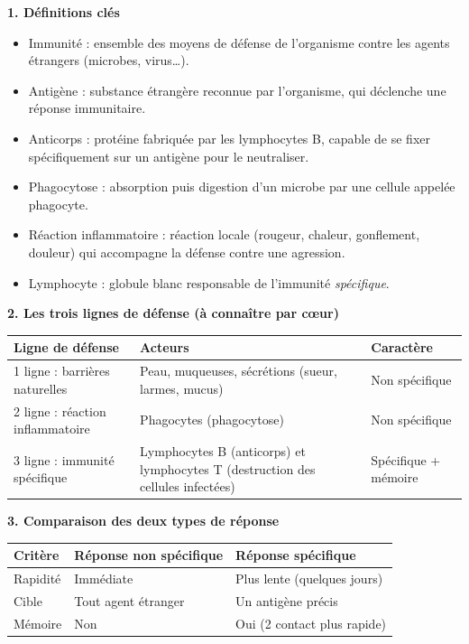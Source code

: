 \documentclass[11pt]{article}
\newcommand{\cle}[1]{{\popxbold\color{popdark}#1}}
\begin{document}
\begin{bilan}
\textbf{1. Définitions clés}
\begin{itemize}
\item \cle{Immunité} : ensemble des moyens de défense de l'organisme contre les agents étrangers (microbes, virus\ldots).
\item \cle{Antigène} : substance étrangère reconnue par l'organisme, qui déclenche une réponse immunitaire.
\item \cle{Anticorps} : protéine fabriquée par les lymphocytes B, capable de se fixer spécifiquement sur un antigène pour le neutraliser.
\item \cle{Phagocytose} : absorption puis digestion d'un microbe par une cellule appelée \cle{phagocyte}.
\item \cle{Réaction inflammatoire} : réaction locale (rougeur, chaleur, gonflement, douleur) qui accompagne la défense contre une agression.
\item \cle{Lymphocyte} : globule blanc responsable de l'immunité \emph{spécifique}.
\end{itemize}

\textbf{2. Les trois lignes de défense (à connaître par c\oe ur)}
\begin{center}
\begin{tabularx}{\linewidth}{|l|X|X|}
\hline
\rowcolor{popblueL} \textbf{Ligne de défense} & \textbf{Acteurs} & \textbf{Caractère} \\
\hline
1\iere{} ligne : barrières naturelles & Peau, muqueuses, sécrétions (sueur, larmes, mucus) & Non spécifique \\
\hline
2\ieme{} ligne : réaction inflammatoire & Phagocytes (phagocytose) & Non spécifique \\
\hline
3\ieme{} ligne : immunité spécifique & Lymphocytes B (anticorps) et lymphocytes T (destruction des cellules infectées) & Spécifique + mémoire \\
\hline
\end{tabularx}
\end{center}

\textbf{3. Comparaison des deux types de réponse}
\begin{center}
\begin{tabularx}{\linewidth}{|l|X|X|}
\hline
\rowcolor{popgreenL} \textbf{Critère} & \textbf{Réponse non spécifique} & \textbf{Réponse spécifique} \\
\hline
Rapidité & Immédiate & Plus lente (quelques jours) \\
\hline
Cible & Tout agent étranger & Un antigène précis \\
\hline
Mémoire & Non & Oui (2\ieme{} contact plus rapide) \\
\hline
\end{tabularx}
\end{center}


\end{bilan}
\end{document}
